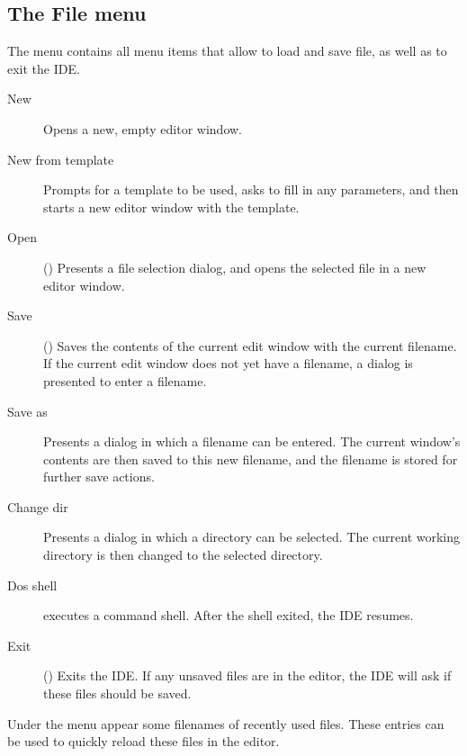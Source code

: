 \subsection{The File menu}
\label{se:menufile}
The  menu contains all menu items that allow to load and save file, as
well as to exit the IDE.
\begin{description}
\item[New] Opens a new, empty editor window. 
\item[New from template] Prompts for a template to be used, asks to fill in
any parameters, and then starts a new editor window with the template.
\item[Open] () Presents a file selection dialog, and opens 
the selected file in a new editor window. 
\item[Save] () Saves the contents of the current edit window 
with the current filename. If the current edit window does not yet have
a filename, a dialog is presented to enter a filename.
\item[Save as] Presents a dialog in which a filename can be entered. The
current window's contents are then saved to this new filename, and the
filename is stored for further save actions.
\item[Change dir] Presents a dialog in which a directory can be selected.
The current working directory is then changed to the selected directory.
\item[Dos shell] executes a command shell. After the shell exited, the
IDE resumes.
\item[Exit] () Exits the IDE. If any unsaved files are 
in the editor, the IDE will ask if these files should be saved.
\end{description}
Under the  menu appear some filenames of recently used files.
These entries can be used to quickly reload these files in the editor.

%
%
